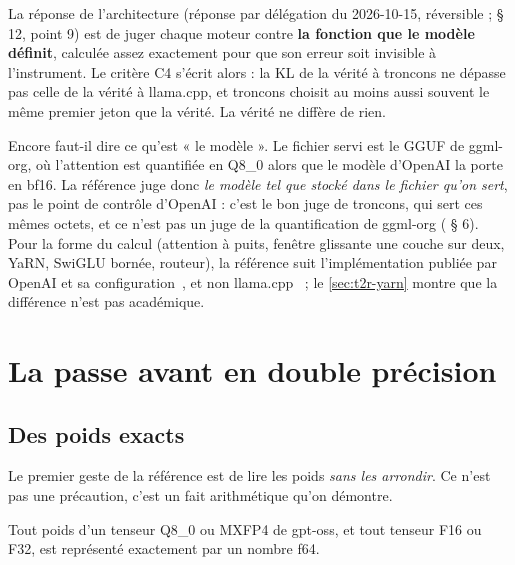La réponse de l'architecture (réponse par délégation du 2026-10-15, réversible ;  § 12, point 9) est de juger chaque moteur contre \textbf{la fonction que le modèle définit}, calculée assez exactement pour que son erreur soit invisible à l'instrument. Le critère C4 s'écrit alors : la KL de la vérité à troncons ne dépasse pas celle de la vérité à llama.cpp, et troncons choisit au moins aussi souvent le même premier jeton que la vérité. La vérité ne diffère de rien.

Encore faut-il dire ce qu'est « le modèle ». Le fichier servi est le GGUF de ggml-org, où l'attention est quantifiée en Q8\_0 alors que le modèle d'OpenAI la porte en bf16. La référence juge donc \emph{le modèle tel que stocké dans le fichier qu'on sert}, pas le point de contrôle d'OpenAI : c'est le bon juge de troncons, qui sert ces mêmes octets, et ce n'est pas un juge de la quantification de ggml-org ( § 6). Pour la forme du calcul (attention à puits, fenêtre glissante une couche sur deux, YaRN, SwiGLU bornée, routeur), la référence suit l'implémentation publiée par OpenAI et sa configuration~\cite{openai2025gptossref,openai2025gptoss20bconfig}, et non llama.cpp~\cite{ggml2026llamacppb11515} ; le \cref{sec:t2r-yarn} montre que la différence n'est pas académique.

\section{La passe avant en double précision}\label{sec:t2r-passe}

\subsection{Des poids exacts}\label{sec:t2r-poids}

Le premier geste de la référence est de lire les poids \emph{sans les arrondir}. Ce n'est pas une précaution, c'est un fait arithmétique qu'on démontre.

\begin{lemme}\label{lem:t2r-exact}
Tout poids d'un tenseur Q8\_0 ou MXFP4 de gpt-oss, et tout tenseur F16 ou F32, est représenté exactement par un nombre f64.
\end{lemme}

